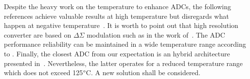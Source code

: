 Despite the heavy work on the temperature to enhance ADCs, the following references achieve valuable results at high temperature but disregards what happen at negative temperature~\cite{Rahman2017,Davis2003,Ericson2004}. It is worth to point out that high resolution converter are based on \(\Delta\Sigma \) modulation such as in the work of~\cite{Souri2014,Davis2003,Ericson2004}. The ADC performance reliability can be maintained in
a wide temperature range according to \cite{Fonseca2018}. Finally, the closest ADC from our expectation is an hybrid architecture presented in~\cite{Souri2014}. Nevertheless, the latter operates for a reduced temperature range which does not exceed 125\(\degree \)C. A new solution shall be considered.
